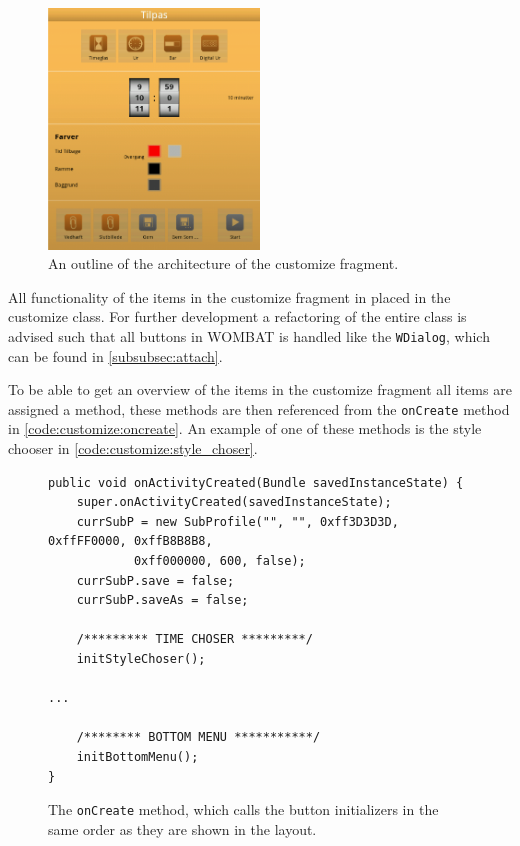 \begin{figure}[H]
	\centering
		\includegraphics[width=0.5\textwidth]{Images/Implementation/customize_layout.png}
	\caption{An outline of the architecture of the customize fragment.}
	\label{fig:customize:layout}
\end{figure}

All functionality of the items in the customize fragment in placed in the customize class.
For further development a refactoring of the entire class is advised such that all buttons in WOMBAT is handled like the \texttt{WDialog}, which can be found in \autoref{subsubsec:attach}.

To be able to get an overview of the items in the customize fragment all items are assigned a method, these methods are then referenced from the \texttt{onCreate} method in \autoref{code:customize:oncreate}. An example of one of these methods is the style chooser in \autoref{code:customize:style_choser}.

\begin{figure}[H]
\begin{lstlisting}
public void onActivityCreated(Bundle savedInstanceState) {
	super.onActivityCreated(savedInstanceState);
	currSubP = new SubProfile("", "", 0xff3D3D3D, 0xffFF0000, 0xffB8B8B8,
			0xff000000, 600, false);
	currSubP.save = false;
	currSubP.saveAs = false;

	/********* TIME CHOSER *********/
	initStyleChoser();

...

	/******** BOTTOM MENU ***********/
	initBottomMenu();
}
\end{lstlisting}
\caption{The \texttt{onCreate} method, which calls the button initializers in the same order as they are shown in the layout.}%
\label{code:customize:oncreate}%
\end{figure}


